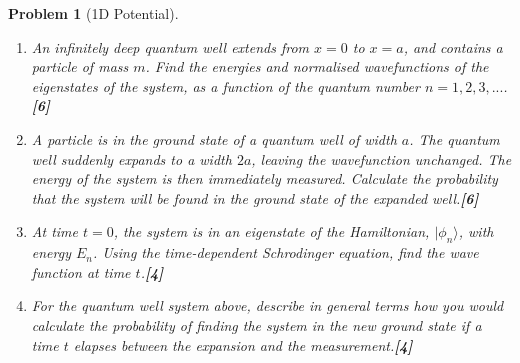 \documentclass[a4paper]{article}
\theoremstyle{new}
\newtheorem{qns}{Problem}[subsection]
\begin{document}
\newpage
\begin{qns}[1D Potential]\leavevmode
\begin{enumerate}[label=(\roman*)]
\item An infinitely deep quantum well extends from $x = 0$ to $x = a$, and contains a particle of mass $m$. Find the energies and normalised wavefunctions of the eigenstates of the system, as a function of the quantum number $n=1,2,3,...$.\hfill\textbf{[6]}
\item A particle is in the ground state of a quantum well of width $a$. The quantum well suddenly expands to a width $2a$, leaving the wavefunction unchanged. The energy of the system is then immediately measured. Calculate the probability that the system will be found in the ground state of the expanded well.\hfill\textbf{[6]}
\item At time $t = 0$, the system is in an eigenstate of the Hamiltonian, $|\phi_n\rangle$, with energy $E_n$. Using the time-dependent Schrodinger equation, find the wave function at time $t$.\hfill\textbf{[4]}
\item For the quantum well system above, describe in general terms how you would calculate the probability of finding the system in the new ground state if a time $t$ elapses between the expansion and the measurement.\hfill\textbf{[4]}
\end{enumerate}
\end{qns}
\end{document}
